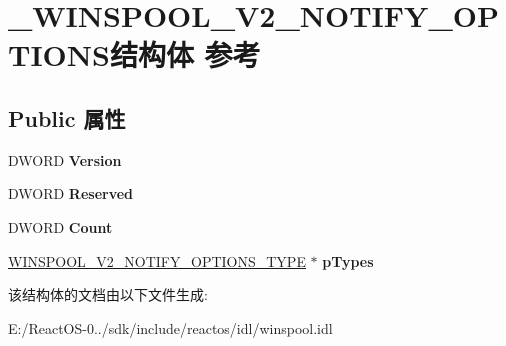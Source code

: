 \hypertarget{struct___w_i_n_s_p_o_o_l___v2___n_o_t_i_f_y___o_p_t_i_o_n_s}{}\section{\+\_\+\+W\+I\+N\+S\+P\+O\+O\+L\+\_\+\+V2\+\_\+\+N\+O\+T\+I\+F\+Y\+\_\+\+O\+P\+T\+I\+O\+N\+S结构体 参考}
\label{struct___w_i_n_s_p_o_o_l___v2___n_o_t_i_f_y___o_p_t_i_o_n_s}
\subsection*{Public 属性}
\begin{DoxyCompactItemize}
\item 
\mbox{\label{struct___w_i_n_s_p_o_o_l___v2___n_o_t_i_f_y___o_p_t_i_o_n_s_a99d353ddca4931427ecca2a3640450a8}} 
D\+W\+O\+RD {\bfseries Version}
\item 
\mbox{\label{struct___w_i_n_s_p_o_o_l___v2___n_o_t_i_f_y___o_p_t_i_o_n_s_a76f4115b565932474faf68db1349c2e5}} 
D\+W\+O\+RD {\bfseries Reserved}
\item 
\mbox{\label{struct___w_i_n_s_p_o_o_l___v2___n_o_t_i_f_y___o_p_t_i_o_n_s_aa0e702f0a709d89403ccca2dbbda13a8}} 
D\+W\+O\+RD {\bfseries Count}
\item 
\mbox{\label{struct___w_i_n_s_p_o_o_l___v2___n_o_t_i_f_y___o_p_t_i_o_n_s_a54a4f03877b38bd4c3c63fbe27b3a29b}} 
\hyperlink{struct___w_i_n_s_p_o_o_l___v2___n_o_t_i_f_y___o_p_t_i_o_n_s___t_y_p_e}{W\+I\+N\+S\+P\+O\+O\+L\+\_\+\+V2\+\_\+\+N\+O\+T\+I\+F\+Y\+\_\+\+O\+P\+T\+I\+O\+N\+S\+\_\+\+T\+Y\+PE} $\ast$ {\bfseries p\+Types}
\end{DoxyCompactItemize}


该结构体的文档由以下文件生成\+:\begin{DoxyCompactItemize}
\item 
E\+:/\+React\+O\+S-\/0../sdk/include/reactos/idl/winspool.\+idl\end{DoxyCompactItemize}
